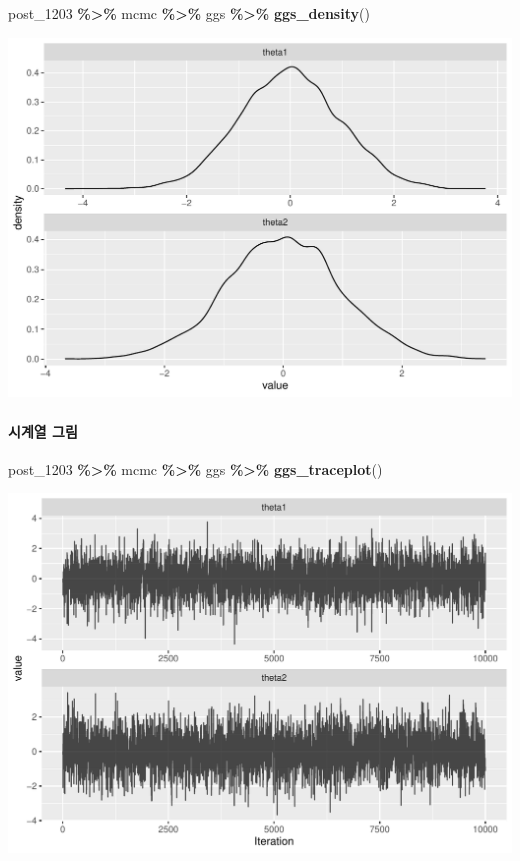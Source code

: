 \documentclass[
]{article}
\newenvironment{Shaded}{\begin{snugshade}}{\end{snugshade}}
\newcommand{\FunctionTok}[1]{\textcolor[rgb]{0.13,0.29,0.53}{\textbf{#1}}}
\newcommand{\NormalTok}[1]{#1}
\newcommand{\SpecialCharTok}[1]{\textcolor[rgb]{0.81,0.36,0.00}{\textbf{#1}}}
\begin{document}
\begin{Shaded}
\begin{Highlighting}[]
\NormalTok{post\_1203 }\SpecialCharTok{\%\textgreater{}\%}\NormalTok{ mcmc }\SpecialCharTok{\%\textgreater{}\%}\NormalTok{ ggs }\SpecialCharTok{\%\textgreater{}\%} \FunctionTok{ggs\_density}\NormalTok{()}
\end{Highlighting}
\end{Shaded}

\begin{center}\includegraphics[width=0.8\linewidth]{Bayes_stat_hw3_files/figure-latex/unnamed-chunk-5-2} \end{center}

\paragraph{시계열 그림}\label{uxc2dcuxacc4uxc5f4-uxadf8uxb9bc}

\begin{Shaded}
\begin{Highlighting}[]
\NormalTok{post\_1203 }\SpecialCharTok{\%\textgreater{}\%}\NormalTok{ mcmc }\SpecialCharTok{\%\textgreater{}\%}\NormalTok{ ggs }\SpecialCharTok{\%\textgreater{}\%} \FunctionTok{ggs\_traceplot}\NormalTok{()}
\end{Highlighting}
\end{Shaded}

\begin{center}\includegraphics[width=0.8\linewidth]{Bayes_stat_hw3_files/figure-latex/unnamed-chunk-6-1} \end{center}
\end{document}

